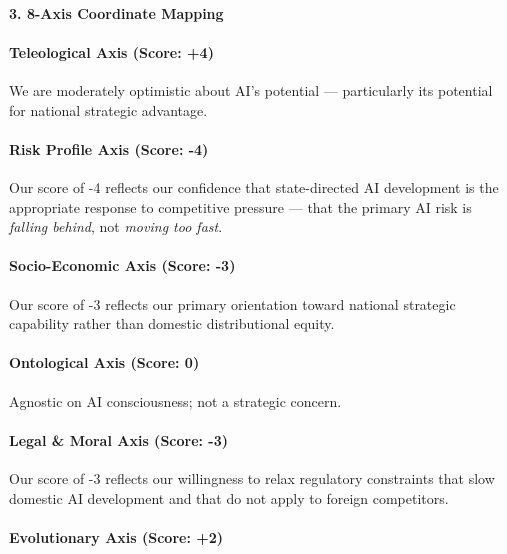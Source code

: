 \paragraph{3. 8-Axis Coordinate
Mapping}\label{axis-coordinate-mapping-19}

\paragraph{Teleological Axis (Score:
+4)}\label{teleological-axis-score-4-1}

We are moderately optimistic about AI's potential --- particularly its
potential for national strategic advantage.

\paragraph{Risk Profile Axis (Score:
-4)}\label{risk-profile-axis-score--4-1}

Our score of -4 reflects our confidence that state-directed AI
development is the appropriate response to competitive pressure --- that
the primary AI risk is \emph{falling behind}, not \emph{moving too
fast}.

\paragraph{Socio-Economic Axis (Score:
-3)}\label{socio-economic-axis-score--3-1}

Our score of -3 reflects our primary orientation toward national
strategic capability rather than domestic distributional equity.

\paragraph{Ontological Axis (Score:
0)}\label{ontological-axis-score-0-7}

Agnostic on AI consciousness; not a strategic concern.

\paragraph{Legal \& Moral Axis (Score:
-3)}\label{legal-moral-axis-score--3}

Our score of -3 reflects our willingness to relax regulatory constraints
that slow domestic AI development and that do not apply to foreign
competitors.

\paragraph{Evolutionary Axis (Score:
+2)}\label{evolutionary-axis-score-2-1}

